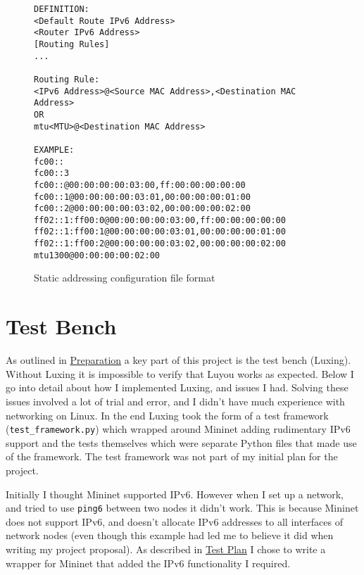 \documentclass[12pt,a4paper,twoside,openright]{report}
\begin{document}
\begin{figure}
\begin{varwidth}{\linewidth}
\begin{verbatim}
DEFINITION:
<Default Route IPv6 Address>
<Router IPv6 Address>
[Routing Rules]
...

Routing Rule:
<IPv6 Address>@<Source MAC Address>,<Destination MAC Address>
OR
mtu<MTU>@<Destination MAC Address>

EXAMPLE:
fc00::
fc00::3
fc00::@00:00:00:00:03:00,ff:00:00:00:00:00
fc00::1@00:00:00:00:03:01,00:00:00:00:01:00
fc00::2@00:00:00:00:03:02,00:00:00:00:02:00
ff02::1:ff00:0@00:00:00:00:03:00,ff:00:00:00:00:00
ff02::1:ff00:1@00:00:00:00:03:01,00:00:00:00:01:00
ff02::1:ff00:2@00:00:00:00:03:02,00:00:00:00:02:00
mtu1300@00:00:00:00:02:00
\end{verbatim}
\end{varwidth}
\caption{Static addressing configuration file format}
\label{fig::config_file}
\end{figure}

\section{Test Bench}

As outlined in \hyperref[chap::preparation]{Preparation} a key part of this project is the test bench (Luxing). Without Luxing it is impossible to verify that Luyou works as expected.  Below I go into detail about how I implemented Luxing, and issues I had.  Solving these issues involved a lot of trial and error, and I didn't have much experience with networking on Linux.  In the end Luxing took the form of a test framework (\verb!test_framework.py!) which wrapped around Mininet adding rudimentary IPv6 support and the tests themselves which were separate Python files that made use of the framework. The test framework was not part of my initial plan for the project.

\bigskip

Initially I thought Mininet\cite{mininet} supported IPv6.  However when I set up a network, and tried to use \verb!ping6! between two nodes it didn't work.  This is because Mininet does not support IPv6, and doesn't allocate IPv6 addresses to all interfaces of network nodes (even though this example\cite{tw_mininet} had led me to believe it did when writing my project proposal).  As described in \hyperref[sec::test_plan]{Test Plan} I chose to write a wrapper for Mininet that added the IPv6 functionality I required.  
\end{document}
